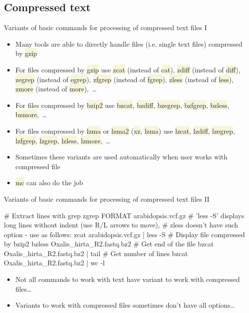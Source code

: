 \documentclass[compress, ucs, xelatex, 11pt, xcolor=svgnames, aspectratio=169,
	hyperref={
		bookmarks=true,
		unicode=true,
		colorlinks=true,
		pdftitle={Linux, command line and MetaCentrum},
		plainpages=false,
		pdfauthor={Vojtech Zeisek},
		pdfsubject={Course about use of Linux command line, writing shell scripts and using MetaCentrum of CESNET},
		pdfcreator={XeLaTeX},
		pdfkeywords={Linux, GNU, BASH, shell, command line, MetaCentrum},
		linkcolor=DarkRed, %
		anchorcolor=DarkBlue, %
		citecolor=Indigo, %
		filecolor=NavyBlue, %
		menucolor=DarkMagenta, %
		urlcolor=DarkBlue, %
		pdftex},
	url={hyphens, lowtilde} %
	]{beamer}
\renewcommand{\texttt}[1]{\colorbox{Beige}{{\ttfamily #1}}}
\begin{document}
\subsection{Compressed text}

\begin{frame}{Variants of basic commands for processing of compressed text files I}
	\begin{itemize}
		\item Many tools are able to directly handle files (i.e. single text files) compressed by \texttt{gzip}
		\item For files compressed by \texttt{gzip} use \texttt{zcat} (instead of \texttt{cat}), \texttt{zdiff} (instead of \texttt{diff}), \texttt{zegrep} (instead of \texttt{egrep}), \texttt{zfgrep} (instead of \texttt{fgrep}), \texttt{zless} (instead of \texttt{less}), \texttt{zmore} (instead of \texttt{more}),~\ldots
		\item For files compressed by \texttt{bzip2} use \texttt{bzcat}, \texttt{bzdiff}, \texttt{bzegrep}, \texttt{bzfgrep}, \texttt{bzless}, \texttt{bzmore},~\ldots
		\item For files compressed by \texttt{lzma} or \texttt{lzma2} (\texttt{xz}, \texttt{lzma}) use \texttt{lzcat}, \texttt{lzdiff}, \texttt{lzegrep}, \texttt{lzfgrep}, \texttt{lzgrep}, \texttt{lzless}, \texttt{lzmore},~\ldots
		\item Sometimes these variants are used automatically when user works with compressed file
		\item \texttt{mc} can also do the job
	\end{itemize}
\end{frame}

\begin{frame}[fragile]{Variants of basic commands for processing of compressed text files II}
	\begin{bashcode}
    # Extract lines with grep
    zgrep FORMAT arabidopsis.vcf.gz
    # 'less -S' displays long lines without indent (use R/L arrows to move),
    # zless doesn't have such option - use as follows:
    zcat arabidopsis.vcf.gz | less -S
    # Display file compressed by bzip2
    bzless Oxalis_hirta_R2.fastq.bz2
    # Get end of the file
    bzcat Oxalis_hirta_R2.fastq.bz2 | tail
    # Get number of lines
    bzcat Oxalis_hirta_R2.fastq.bz2 | wc -l
	\end{bashcode}
	\begin{itemize}
		\item Not all commands to work with text have variant to work with compressed files\ldots
		\item Variants to work with compressed files sometimes don't have all options\ldots
	\end{itemize}
\end{frame}
\end{document}
